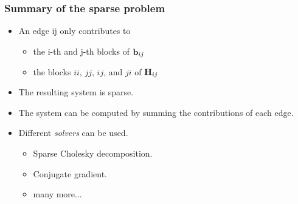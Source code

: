     \begin{frame}
    \frametitle{Summary of the sparse problem}
    
    \begin{itemize}
    \item An edge ij only contributes to
    \begin{itemize}
    \item the i-th and j-th blocks of $\boldsymbol{\mathbf{b}}_{ij}$
    \item the blocks $ii$, $jj$, $ij$, and $ji$ of $\boldsymbol{\mathbf{H}}_{ij}$
    \end{itemize}
    \item The resulting system is sparse.
    \item The system can be computed by summing the contributions of each edge.
    \item Different \emph{solvers} can be used.
    \begin{itemize}
    \item Sparse Cholesky decomposition.
    \item Conjugate gradient. \item many more...
     \end{itemize}
    
     \end{itemize}
    
    
\end{frame}

